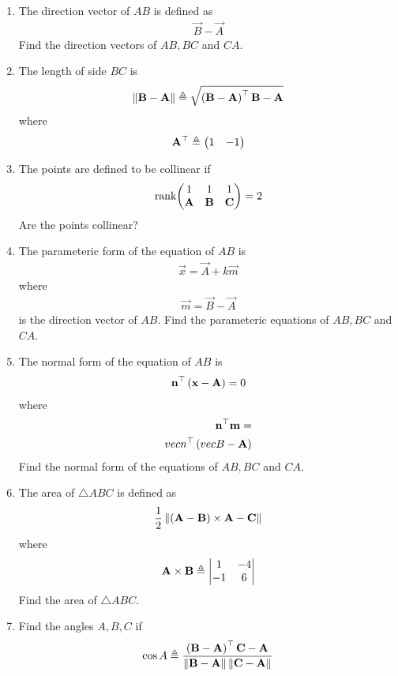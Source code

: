 \begin{enumerate}[label=\thesection.\arabic*.,ref=\thesection.\theenumi]
\item The direction vector of $AB$ is defined as
		\begin{align}
			\vec{B}-
			\vec{A}
		\end{align}
Find the direction vectors of $AB, BC$ and $CA$.
	\item The length of side $BC$ is 
		\begin{align}
			\left\lVert\mathbf{B}-\mathbf{A}\right\rVert \triangleq \sqrt{\left(\mathbf{B}-\mathbf{A}\right)^{\top}{\mathbf{B}-\mathbf{A}}}
		\end{align}
		where
		\begin{align}
			\mathbf{A}^{\top}\triangleq\begin{pmatrix}1 & -1\end{pmatrix}
		\end{align}
\item   The points are defined to be collinear if 
		\begin{align}
			\text{rank}{\ensuremath{\begin{pmatrix}1 & 1 & 1 \\ \mathbf{A}& \mathbf{B}&\mathbf{C}\end{pmatrix}}} = 2
		\end{align}
Are the points collinear?
\item The parameteric form of the equation  of $AB$ is 
		\begin{align}
			\vec{x}=\vec{A}+k\vec{m}
		\end{align}
		where
		\begin{align}
\vec{m}=\vec{B}-\vec{A}
		\end{align}
is the direction vector of $AB$.
Find the parameteric equations of $AB, BC$ and $CA$.
\item The normal form of the equation of $AB$  is 
		\begin{align}
			\mathbf{n}^{\top}\left(	\mathbf{x}-\mathbf{A}\right) = 0
		\end{align}
		where 
		\begin{align}
			\mathbf{n}^{\top}\mathbf{m}=\\vec{n}^{\top}\left(vec{B}-\mathbf{A}\right)
		\end{align}
Find the normal form of the equations of $AB, BC$ and $CA$.
\item The area of $\triangle ABC$ is defined as
		\begin{align}
			\frac{1}{2}\left\lVert{\ensuremath{\left(\mathbf{A}-\mathbf{B}\right)}\times {\mathbf{A}-\mathbf{C}}}\right\rVert
		\end{align}
		where
		\begin{align}
			\mathbf{A}\times\mathbf{B} \triangleq \begin{vmatrix}1 & -4 \\-1 & 6\end{vmatrix}
		\end{align}
		Find the area of $\triangle ABC$.
	\item Find the angles $A, B, C$ if 
    \label{prop:angle2d}
  \begin{align}
    \label{eq:angle2d}
			\cos A \triangleq 
\frac{\brak{\vec{B}-\vec{A}}^{\top}{\vec{C}-\vec{A}}}{\norm{\vec{B}-\vec{A}}\norm{\vec{C}-\vec{A}}}
  \end{align}
\end{enumerate}
